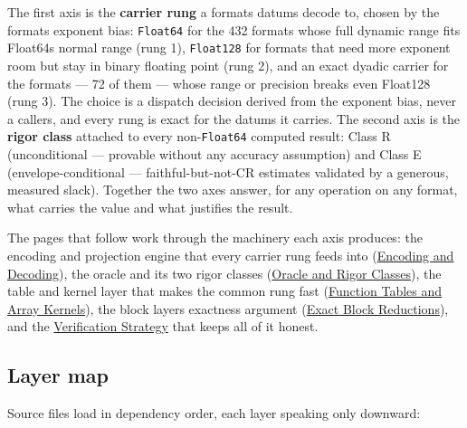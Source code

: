 The first axis is the \textbf{carrier rung} a format{\textquotesingle}s datums decode to, chosen by the format{\textquotesingle}s exponent bias: \texttt{Float64} for the 432 formats whose full dynamic range fits Float64{\textquotesingle}s normal range (rung 1), \texttt{Float128} for formats that need more exponent room but stay in binary floating point (rung 2), and an exact dyadic carrier for the formats — 72 of them — whose range or precision breaks even Float128 (rung 3). The choice is a dispatch decision derived from the exponent bias, never a caller{\textquotesingle}s, and every rung is exact for the datums it carries. The second axis is the \textbf{rigor class} attached to every non-\texttt{Float64} computed result: Class R (unconditional — provable without any accuracy assumption) and Class E (envelope-conditional — faithful-but-not-CR estimates validated by a generous, measured slack). Together the two axes answer, for any operation on any format, {\textquotedbl}what carries the value{\textquotedbl} and {\textquotedbl}what justifies the result.{\textquotedbl}



The pages that follow work through the machinery each axis produces: the encoding and projection engine that every carrier rung feeds into (\href{internals\_\allowbreak{}encoding\_\allowbreak{}decoding.md}{Encoding and Decoding}), the oracle and its two rigor classes (\href{internals\_\allowbreak{}oracle.md}{Oracle and Rigor Classes}), the table and kernel layer that makes the common rung fast (\href{internals\_\allowbreak{}tables.md}{Function Tables and Array Kernels}), the block layer{\textquotesingle}s exactness argument (\href{internals\_\allowbreak{}blocks.md}{Exact Block Reductions}), and the \href{internals\_\allowbreak{}verification.md}{Verification Strategy} that keeps all of it honest.



\subsection{Layer map}



\label{9668567837796074949}{}


Source files load in dependency order, each layer speaking only downward:




